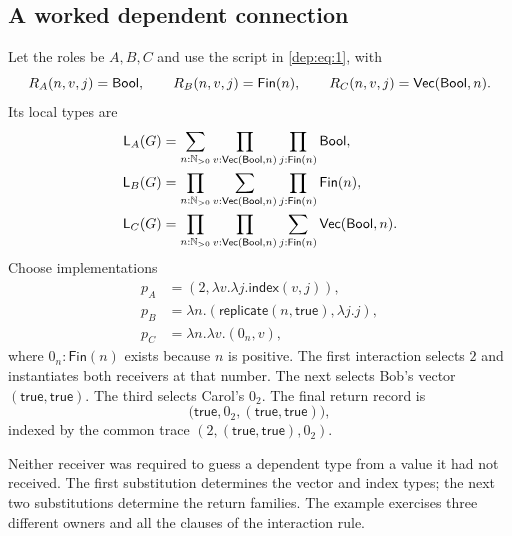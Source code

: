 \subsection{A worked dependent connection}
\label{app:worked}

Let the roles be $A,B,C$ and use the script in \eqref{dep:eq:1}, with
\[
 R_A(n,v,j)=\mathsf{Bool},\qquad R_B(n,v,j)=\mathsf{Fin}(n),
 \qquad R_C(n,v,j)=\mathsf{Vec}(\mathsf{Bool},n).
\]
Its local types are
\begin{align*}
 \mathsf L_{A}(G)
   &=\sum_{n:\mathbb N_{>0}}\prod_{v:\mathsf{Vec}(\mathsf{Bool},n)}
                    \prod_{j:\mathsf{Fin}(n)}\mathsf{Bool},\\
 \mathsf L_{B}(G)
   &=\prod_{n:\mathbb N_{>0}}\sum_{v:\mathsf{Vec}(\mathsf{Bool},n)}
                    \prod_{j:\mathsf{Fin}(n)}\mathsf{Fin}(n),\\
 \mathsf L_{C}(G)
   &=\prod_{n:\mathbb N_{>0}}\prod_{v:\mathsf{Vec}(\mathsf{Bool},n)}
                    \sum_{j:\mathsf{Fin}(n)}\mathsf{Vec}(\mathsf{Bool},n).
\end{align*}
Choose implementations
\begin{align*}
 p_A&=(2,\lambda v.\lambda j.\mathsf{index}(v,j)),\\
 p_B&=\lambda n.(\mathsf{replicate}(n,\mathsf{true}),\lambda j.j),\\
 p_C&=\lambda n.\lambda v.(0_n,v),
\end{align*}
where $0_n:\mathsf{Fin}(n)$ exists because $n$ is positive. The first
interaction selects $2$ and instantiates both receivers at that number.
The next selects Bob's vector $(\mathsf{true},\mathsf{true})$. The third
selects Carol's $0_2$. The final return record is
\[
 \bigl(\mathsf{true},0_2,
       (\mathsf{true},\mathsf{true})\bigr),
\]
indexed by the common trace
$(2,(\mathsf{true},\mathsf{true}),0_2)$.

Neither receiver was required to guess a dependent type from a value it had
not received. The first substitution determines the vector and index types;
the next two substitutions determine the return families. The example
exercises three different owners and all the clauses of the interaction rule.
